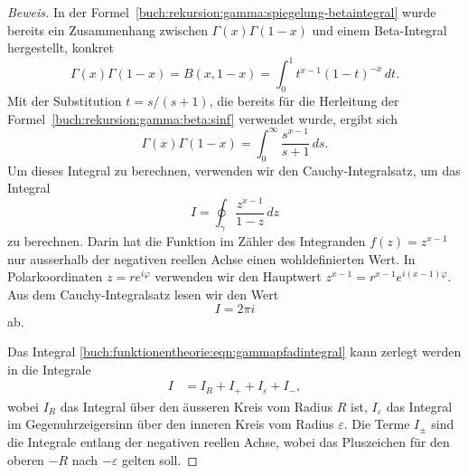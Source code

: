\begin{proof}[Beweis]
In der Formel~\eqref{buch:rekursion:gamma:spiegelung-betaintegral}
wurde bereits ein Zusammenhang zwischen $\Gamma(x)\Gamma(1-x)$
und einem Beta-Integral hergestellt, konkret
\[
\Gamma(x)\Gamma(1-x)
=
B(x,1-x)
=
\int_0^1 t^{x-1}(1-t)^{-x}\,dt.
\]
Mit der Substitution $t=s/(s+1)$, die bereits für die Herleitung der
Formel~\eqref{buch:rekursion:gamma:beta:sinf} verwendet wurde, ergibt sich
\[
\Gamma(x)\Gamma(1-x)
=
\int_0^\infty 
\frac{s^{x-1}}{s+1}
\,ds.
\]
Um dieses Integral zu berechnen, verwenden wir den Cauchy-Integralsatz,
um das Integral
\begin{equation}
I
=
\oint_\gamma \frac{z^{x-1}}{1-z}\,dz
\label{buch:funktionentheorie:eqn:gammapfadintegral}
\end{equation}
zu berechnen.
Darin hat die Funktion im Zähler des Integranden $f(z)=z^{x-1}$ 
nur ausserhalb der negativen reellen Achse einen wohldefinierten Wert.
In Polarkoordinaten $z=re^{i\varphi}$ verwenden wir
den Hauptwert $z^{x-1}=r^{x-1}e^{i(x-1)\varphi}$.
Aus dem Cauchy-Integralsatz lesen wir den Wert
\[
I = 2\pi i
\]
ab.

Das Integral \eqref{buch:funktionentheorie:eqn:gammapfadintegral}
kann zerlegt werden in die Integrale
\begin{align*}
I
&=
I_R+I_++I_\varepsilon+I_-,
\end{align*}
wobei $I_R$ das Integral über den äusseren Kreis vom Radius $R$ ist,
$I_\varepsilon$ das Integral im Gegenuhrzeigersinn über den inneren Kreis
vom Radius $\varepsilon$.
Die Terme $I_{\pm}$ sind die Integrale entlang der negativen
reellen Achse, wobei das Pluszeichen für den oberen $-R$ nach
$-\varepsilon$ gelten soll.


\end{proof}
